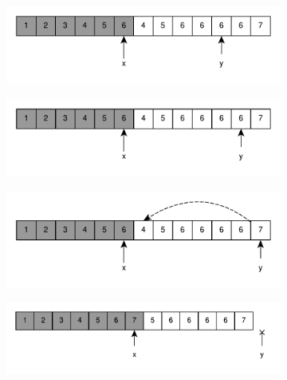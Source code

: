 \begin{figure}
\begin{subfigure}[t]{0.45\textwidth}
		\caption{}
		\label{fig:remove_duplicated_sorted_array_inplace:example1_6}
	 \end{subfigure}
	 \hfill
	 \begin{subfigure}[t]{0.45\textwidth}
		\includegraphics[width=1\linewidth]{sources/remove_duplicated_sorted_array_inplace/images/example1_12}
		\caption{}
		\label{fig:remove_duplicated_sorted_array_inplace:example1_6}
	 \end{subfigure}
	 \hfill
	 \begin{subfigure}[t]{0.45\textwidth}
		\includegraphics[width=1\linewidth]{sources/remove_duplicated_sorted_array_inplace/images/example1_13}
		\caption{}
		\label{fig:remove_duplicated_sorted_array_inplace:example1_6}
	 \end{subfigure}
	 \hfill
	 \begin{subfigure}[t]{0.45\textwidth}
		\includegraphics[width=1\linewidth]{sources/remove_duplicated_sorted_array_inplace/images/example1_14}
		\caption{}
		\label{fig:remove_duplicated_sorted_array_inplace:example1_6}
	 \end{subfigure}
	 \hfill
	 \begin{subfigure}[t]{0.45\textwidth}
		\includegraphics[width=1\linewidth]{sources/remove_duplicated_sorted_array_inplace/images/example1_15}
		\caption{}
		\label{fig:remove_duplicated_sorted_array_inplace:example1_6}
	 \end{subfigure}

\end{figure}

